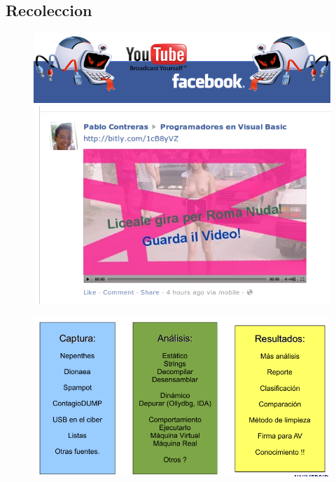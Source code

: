 \documentclass[12pt]{beamer} %
\begin{document}
\subsection{Recoleccion}
\begin{slide}  
    \begin{figure}
      \begin{center}
        \includegraphics[height=0.3\textheight]{img/youtubeface.png} \\
 \includegraphics[height=0.5\textheight]{img/face.png}
      \end{center}
    \end{figure}
\end{slide}


\begin{slide}
    \begin{figure}
      \begin{center}
        \includegraphics[height=0.8\textheight]{img/arq.png}
      \end{center}
    \end{figure}

\end{slide}
\end{document}
